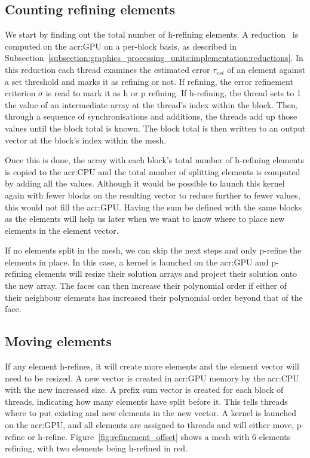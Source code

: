 \subsection{Counting refining elements}\label{subsection:adaptive_mesh_refinement:implementation:counting_refining_elements}

We start by finding out the total number of h-refining elements. A reduction~\cite{Harris2007} is
computed on the \acrshort{acr:GPU} on a per-block basis, as described in
Subsection~\ref{subsection:graphics_processing_units:implementation:reductions}. In this reduction
each thread examines the estimated error \(\tau_{est}\) of an element against a set threshold and
marks it as refining or not. If refining, the error refinement criterion \(\sigma \) is read to mark
it as h or p refining. If h-refining, the thread sets to 1 the value of an intermediate array at the
thread's index within the block. Then, through a sequence of synchronisations and additions, the
threads add up those values until the block total is known. The block total is then written to an
output vector at the block's index within the mesh.

Once this is done, the array with each block's total number of h-refining elements is copied to the
\acrshort{acr:CPU} and the total number of splitting elements is computed by adding all the values.
Although it would be possible to launch this kernel again with fewer blocks on the resulting vector
to reduce further to fewer values, this would not fill the \acrshort{acr:GPU}. Having the sum be
defined with the same blocks as the elements will help us later when we want to know where to place
new elements in the element vector.

If no elements split in the mesh, we can skip the next steps and only p-refine the elements in
place. In this case, a kernel is launched on the \acrshort{acr:GPU} and p-refining elements will
resize their solution arrays and project their solution onto the new array. The faces can then
increase their polynomial order if either of their neighbour elements has increased their polynomial
order beyond that of the face. 

\subsection{Moving elements}\label{subsection:adaptive_mesh_refinement:implementation:moving_elements}

If any element h-refines, it will create more elements and the element vector will need to be
resized. A new vector is created in \acrshort{acr:GPU} memory by the \acrshort{acr:CPU} with the new
increased size. A prefix sum vector is created for each block of threads, indicating how many
elements have split before it. This tells threads where to put existing and new elements in the new
vector. A kernel is launched on the \acrshort{acr:GPU}, and all elements are assigned to threads and
will either move, p-refine or h-refine. Figure~\ref{fig:refinement_offset} shows a mesh with 6
elements refining, with two elements being h-refined in red.


